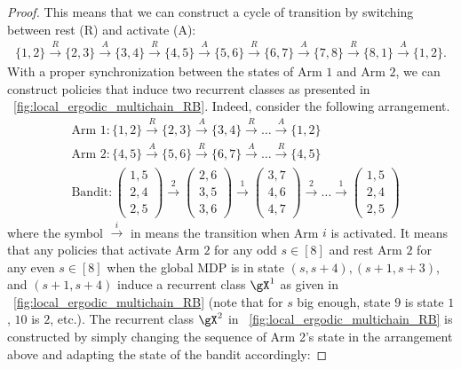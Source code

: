 \begin{proof}
    This means that we can construct a cycle of transition by switching between rest (R) and activate (A):
    \begin{align*}
        \{1,2\} \overset{R}{\to} \{2,3\} \overset{A}{\to} \{3,4\} \overset{R}{\to} \{4,5\} \overset{A}{\to} \{5,6\} \overset{R}{\to} \{6,7\} \overset{A}{\to} \{7,8\} \overset{R}{\to} \{8,1\} \overset{A}{\to} \{1,2\}.
    \end{align*}
    With a proper synchronization between the states of Arm $1$ and Arm $2$, we can construct policies that induce two recurrent classes as presented in \figurename~\ref{fig:local_ergodic_multichain_RB}.
    Indeed, consider the following arrangement.
    \begin{align}
        &\text{Arm 1} : \{1,2\} \overset{R}{\to} \{2,3\} \overset{A}{\to} \{3,4\} \overset{R}{\to} \dots \overset{A}{\to} \{1,2\} \nonumber \\
        &\text{Arm 2} : \{4,5\} \overset{A}{\to} \{5,6\} \overset{R}{\to} \{6,7\} \overset{A}{\to} \dots \overset{R}{\to} \{4,5\} \nonumber \\
        &\text{Bandit} : \begin{pmatrix}1,5\\2,4\\2,5\end{pmatrix} \overset{2}{\to} \begin{pmatrix}2,6\\3,5\\3,6\end{pmatrix} \overset{1}{\to} \begin{pmatrix}3,7\\4,6\\4,7\end{pmatrix} \overset{2}{\to} \dots \overset{1}{\to} \begin{pmatrix}1,5\\2,4\\2,5\end{pmatrix} \label{eq:mdp_transition}
    \end{align}
    where the symbol $\overset{i}{\to}$ in  means the transition when Arm $i$ is activated.
    It means that any policies that activate Arm $2$ for any odd $s\in[8]$ and rest Arm $2$ for any even $s\in[8]$ when the global MDP is in state $(s,s+4), (s+1,s+3)$, and $(s+1,s+4)$ induce a recurrent class $\gX^1$ as given in \figurename~\ref{fig:local_ergodic_multichain_RB} (note that for $s$ big enough, state $9$ is state $1$, $10$ is $2$, etc.).
    The recurrent class $\gX^2$ in \figurename~\ref{fig:local_ergodic_multichain_RB} is constructed by simply changing the sequence of Arm 2's state in the arrangement above and adapting the state of the bandit accordingly:

\end{proof}
